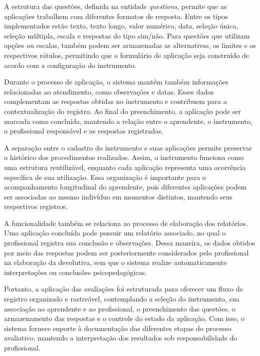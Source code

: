 A estrutura das questões, definida na entidade \textit{questions}, permite que as aplicações trabalhem com diferentes formatos de resposta. Entre os tipos implementados estão texto, texto longo, valor numérico, data, seleção única, seleção múltipla, escala e respostas do tipo sim/não. Para questões que utilizam opções ou escalas, também podem ser armazenadas as alternativas, os limites e os respectivos rótulos, permitindo que o formulário de aplicação seja construído de acordo com a configuração do instrumento.

Durante o processo de aplicação, o sistema mantém também informações relacionadas ao atendimento, como observações e datas. Esses dados complementam as respostas obtidas no instrumento e contribuem para a contextualização do registro. Ao final do preenchimento, a aplicação pode ser marcada como concluída, mantendo a relação entre o aprendente, o instrumento, o profissional responsável e as respostas registradas.

A separação entre o cadastro do instrumento e suas aplicações permite preservar o histórico dos procedimentos realizados. Assim, o instrumento funciona como uma estrutura reutilizável, enquanto cada aplicação representa uma ocorrência específica de sua utilização. Essa organização é importante para o acompanhamento longitudinal do aprendente, pois diferentes aplicações podem ser associadas ao mesmo indivíduo em momentos distintos, mantendo seus respectivos registros.

A funcionalidade também se relaciona ao processo de elaboração dos relatórios. Uma aplicação concluída pode possuir um relatório associado, no qual o profissional registra sua conclusão e observações. Dessa maneira, os dados obtidos por meio das respostas podem ser posteriormente considerados pelo profissional na elaboração da devolutiva, sem que o sistema realize automaticamente interpretações ou conclusões psicopedagógicas.

Portanto, a aplicação das avaliações foi estruturada para oferecer um fluxo de registro organizado e rastreável, contemplando a seleção do instrumento, sua associação ao aprendente e ao profissional, o preenchimento das questões, o armazenamento das respostas e o controle do estado da aplicação. Com isso, o sistema fornece suporte à documentação das diferentes etapas do processo avaliativo, mantendo a interpretação dos resultados sob responsabilidade do profissional.